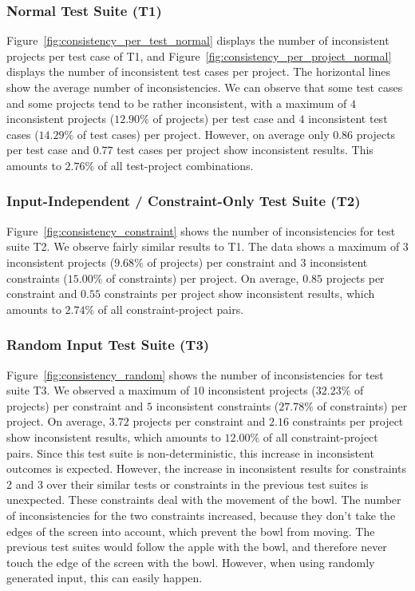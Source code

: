 \subsubsection{Normal Test Suite (T1)}

\noindent Figure~\ref{fig:consistency_per_test_normal} displays the number of inconsistent projects per test case of T1,
and Figure~\ref{fig:consistency_per_project_normal} displays the number of inconsistent test cases per project.
The horizontal lines show the average number of inconsistencies.
We can observe that some test cases and some projects tend to be rather inconsistent,
with a maximum of $4$ inconsistent projects ($12.90\%$ of projects) per test case and $4$ inconsistent test cases ($14.29\%$ of test cases) per project.
However, on average only $0.86$ projects per test case and $0.77$ test cases per project show inconsistent results.
This amounts to $2.76\%$ of all test-project combinations.

\subsubsection{Input-Independent / Constraint-Only Test Suite (T2)}

Figure~\ref{fig:consistency_constraint} shows the number of inconsistencies for test suite T2.
We observe fairly similar results to T1.
The data shows a maximum of $3$ inconsistent projects ($9.68\%$ of projects) per constraint and $3$ inconsistent constraints ($15.00\%$ of constraints) per project.
On average, $0.85$ projects per constraint and $0.55$ constraints per project show inconsistent results,
which amounts to $2.74\%$ of all constraint-project pairs.

\subsubsection{Random Input Test Suite (T3)}

Figure~\ref{fig:consistency_random} shows the number of inconsistencies for test suite T3.
We observed a maximum of $10$ inconsistent projects ($32.23\%$ of projects) per constraint and $5$ inconsistent constraints ($27.78\%$ of constraints) per project.
On average, $3.72$ projects per constraint and $2.16$ constraints per project show inconsistent results,
which amounts to $12.00\%$ of all constraint-project pairs.
Since this test suite is non-deterministic,
this increase in inconsistent outcomes is expected.
However, the increase in inconsistent results for constraints 2 and 3 over their similar tests or constraints in the previous test suites is unexpected.
These constraints deal with the movement of the bowl.
The number of inconsistencies for the two constraints increased, because they don't take the edges of the screen into account, which prevent the bowl from moving.
The previous test suites would follow the apple with the bowl, and therefore never touch the edge of the screen with the bowl.
However, when using randomly generated input, this can easily happen.


